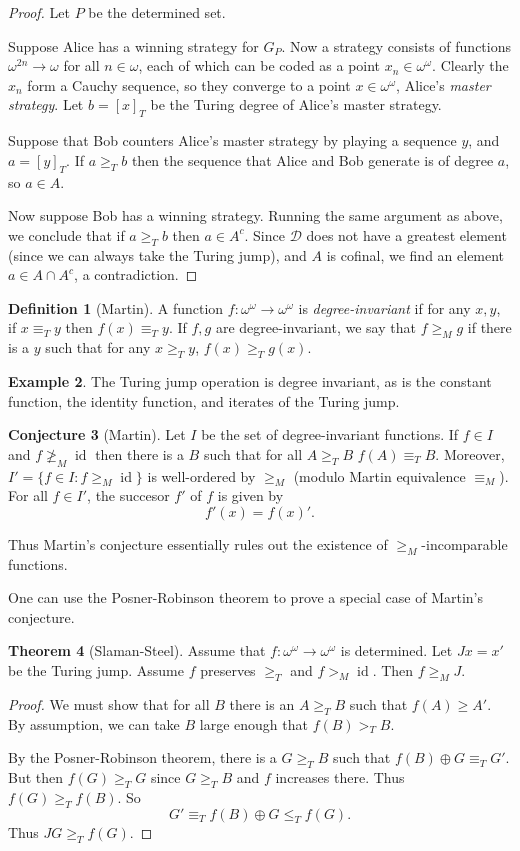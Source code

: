 \documentclass[12pt]{report}
\newcommand{\id}{\operatorname{id}}
\newcommand{\dfn}[1]{\emph{#1}\index{#1}}
\theoremstyle{definition}
\newtheorem{theorem}{Theorem}[chapter]
\newtheorem{conjecture}[theorem]{Conjecture}
\newtheorem{definition}[theorem]{Definition}
\newtheorem{example}[theorem]{Example}
\begin{document}
\begin{proof}
Let $P$ be the determined set.

Suppose Alice has a winning strategy for $G_P$.
Now a strategy consists of functions $\omega^{2n} \to \omega$ for all $n \in \omega$, each of which can be coded as a point $x_n \in \omega^\omega$.
Clearly the $x_n$ form a Cauchy sequence, so they converge to a point $x \in \omega^\omega$, Alice's \dfn{master strategy}. Let $b = [x]_T$ be the Turing degree of Alice's master strategy.

Suppose that Bob counters Alice's master strategy by playing a sequence $y$, and $a = [y]_T$. If $a \geq_T b$ then the sequence that Alice and Bob generate is of degree $a$, so $a \in A$.

Now suppose Bob has a winning strategy. Running the same argument as above, we conclude that if $a \geq_T b$ then $a \in A^c$. Since $\mathcal D$ does not have a greatest element (since we can always take the Turing jump), and $A$ is cofinal, we find an element $a \in A \cap A^c$, a contradiction.
\end{proof}
\begin{definition}[Martin]
A function $f: \omega^\omega \to \omega^\omega$ is \dfn{degree-invariant} if for any $x, y$, if $x \equiv_T y$ then $f(x) \equiv_T y$.
If $f,g$ are degree-invariant, we say that $f \geq_M g$ if there is a $y$ such that for any $x \geq_T y$, $f(x) \geq_T g(x)$.
\end{definition}
\begin{example}
The Turing jump operation is degree invariant, as is the constant function, the identity function, and iterates of the Turing jump.
\end{example}
\begin{conjecture}[Martin]
Let $I$ be the set of degree-invariant functions. If $f \in I$ and $f \not \geq_M \id$ then there is a $B$ such that for all $A \geq_T B$ $f(A) \equiv_T B$.
Moreover, $I' = \{f \in I: f \geq_M \id\}$ is well-ordered by $\geq_M$ (modulo Martin equivalence $\equiv_M$). For all $f \in I'$, the succesor $f'$ of $f$ is given by
$$f'(x) = f(x)'.$$
\end{conjecture}
Thus Martin's conjecture essentially rules out the existence of $\geq_M$-incomparable functions.

One can use the Posner-Robinson theorem to prove a special case of Martin's conjecture.
\begin{theorem}[Slaman-Steel]
Assume that $f: \omega^\omega \to \omega^\omega$ is determined.
Let $Jx = x'$ be the Turing jump. Assume $f$ preserves $\geq_T$ and $f >_M \id$. Then $f \geq_M J$.
\end{theorem}
\begin{proof}
We must show that for all $B$ there is an $A \geq_T B$ such that $f(A) \geq A'$. By assumption, we can take $B$ large enough that $f(B) >_T B$.

By the Posner-Robinson theorem, there is a $G \geq_T B$ such that $f(B) \oplus G \equiv_T G'$. But then $f(G) \geq_T G$ since $G \geq_T B$ and $f$ increases there.
Thus $f(G) \geq_T f(B)$. So
$$G' \equiv_T f(B) \oplus G \leq_T f(G).$$
Thus $JG \geq_T f(G)$.
\end{proof}
\end{document}
